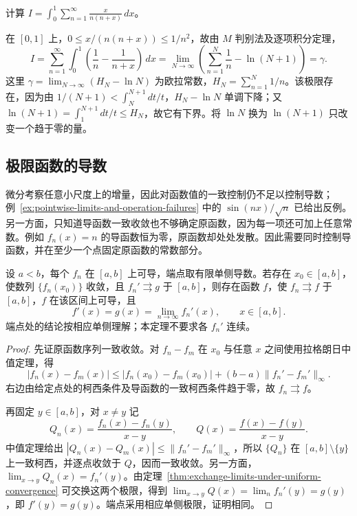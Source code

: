 \documentclass[UTF8,12pt,a4paper,fontset=fandol]{ctexbook}
\begin{document}
\begin{example}
\label{ex:euler-constant-integral-series}
计算 $\displaystyle I=\int_0^1\sum_{n=1}^\infty\frac{x}{n(n+x)}\,dx$。
\end{example}

\begin{solve}
在 $[0,1]$ 上，$0\leq x/(n(n+x))\leq1/n^2$，故由 $M$ 判别法及逐项积分定理，
\[
    I=\sum_{n=1}^\infty\int_0^1
          \left(\frac1n-\frac1{n+x}\right)\,dx
      =\lim_{N\to\infty}\left(\sum_{n=1}^N\frac1n-\ln(N+1)\right)
      =\gamma.
\]
这里 $\gamma=\lim_{N\to\infty}(H_N-\ln N)$ 为欧拉常数，$H_N=\sum_{n=1}^N1/n$。该极限存在，因为由 $1/(N+1)<\int_N^{N+1}dt/t$，$H_N-\ln N$ 单调下降；又 $\ln(N+1)=\int_1^{N+1}dt/t\leq H_N$，故它有下界。将 $\ln N$ 换为 $\ln(N+1)$ 只改变一个趋于零的量。
\end{solve}

\subsection{极限函数的导数}
\label{subsec:derivatives-of-limit-functions}

微分考察任意小尺度上的增量，因此对函数值的一致控制仍不足以控制导数；例~\ref{ex:pointwise-limits-and-operation-failures} 中的 $\sin(nx)/\sqrt n$ 已给出反例。另一方面，只知道导函数一致收敛也不够确定原函数，因为每一项还可加上任意常数。例如 $f_n(x)=n$ 的导函数恒为零，原函数却处处发散。因此需要同时控制导函数，并在至少一个点固定原函数的常数部分。

\begin{theorem}[导数与极限的交换]
\label{thm:differentiation-of-function-sequence}
设 $a<b$，每个 $f_n$ 在 $[a,b]$ 上可导，端点取有限单侧导数。若存在 $x_0\in[a,b]$，使数列 $\{f_n(x_0)\}$ 收敛，且 $f_n'\rightrightarrows g$ 于 $[a,b]$，则存在函数 $f$，使 $f_n\rightrightarrows f$ 于 $[a,b]$，$f$ 在该区间上可导，且
\begin{equation}
    f'(x)=g(x)=\lim_{n\to\infty}f_n'(x),
    \qquad x\in[a,b].
    \label{eq:uniform-derivative-limit}
\end{equation}
端点处的结论按相应单侧理解；本定理不要求各 $f_n'$ 连续。
\end{theorem}

\begin{proof}
先证原函数序列一致收敛。对 $f_n-f_m$ 在 $x_0$ 与任意 $x$ 之间使用拉格朗日中值定理，得
\[
    |f_n(x)-f_m(x)|
    \leq|f_n(x_0)-f_m(x_0)|
       +(b-a)\|f_n'-f_m'\|_\infty.
\]
右边由给定点处的柯西条件及导函数的一致柯西条件趋于零，故 $f_n\rightrightarrows f$。

再固定 $y\in[a,b]$，对 $x\neq y$ 记
\[
    Q_n(x)=\frac{f_n(x)-f_n(y)}{x-y},\qquad
    Q(x)=\frac{f(x)-f(y)}{x-y}.
\]
中值定理给出 $|Q_n(x)-Q_m(x)|\leq\|f_n'-f_m'\|_\infty$，所以 $\{Q_n\}$ 在 $[a,b]\setminus\{y\}$ 上一致柯西，并逐点收敛于 $Q$，因而一致收敛。另一方面，$\lim_{x\to y}Q_n(x)=f_n'(y)$。由定理~\ref{thm:exchange-limits-under-uniform-convergence} 可交换这两个极限，得到 $\lim_{x\to y}Q(x)=\lim_nf_n'(y)=g(y)$，即 $f'(y)=g(y)$。端点采用相应单侧极限，证明相同。
\end{proof}
\end{document}

